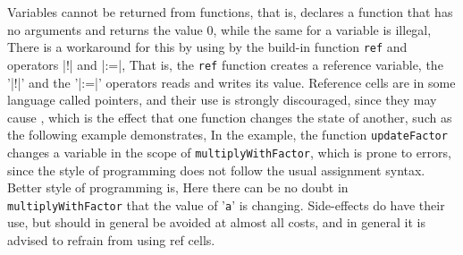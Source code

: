 Variables cannot be returned from functions, that is,
declares a function that has no arguments and returns the value 0, while the same for a variable is illegal,
There is a workaround for this by using  by the build-in function \texttt{ref} and operators \token|!| and \token|:=|,
That is, the \texttt{ref} function creates a reference variable, the '\token|!|' and the '\token|:=|' operators reads and writes its value. Reference cells are in some language called pointers, and their use is strongly discouraged, since they may cause , which is the effect that one function changes the state of another, such as the following example demonstrates,
In the example, the function \texttt{updateFactor} changes a variable in the scope of \texttt{multiplyWithFactor}, which is prone to errors, since the style of programming does not follow the usual assignment syntax. Better style of programming is,
Here there can be no doubt in \texttt{multiplyWithFactor} that the value of '\texttt{a}' is changing. Side-effects do have their use, but should in general be avoided at almost all costs, and in general it is advised to refrain from using ref cells.


